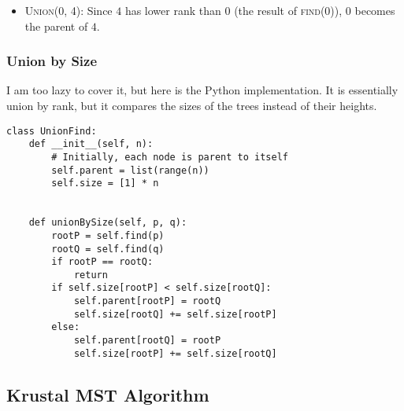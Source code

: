 \begin{itemize}
\begin{center}
    \end{center}
  \item \textsc{Union(0, 4)}: Since $4$ has lower rank than $0$ (the result of \textsc{find(0)}), $0$ becomes the parent of $4$.
    \begin{center}
    \end{center}
\end{itemize}

\subsubsection{Union by Size}

I am too lazy to cover it, but here is the Python implementation.
It is essentially union by rank, but it compares the sizes of the trees instead of their heights.

\begin{verbatim}
class UnionFind:
    def __init__(self, n):
        # Initially, each node is parent to itself
        self.parent = list(range(n))
        self.size = [1] * n


    def unionBySize(self, p, q):
        rootP = self.find(p)
        rootQ = self.find(q)
        if rootP == rootQ:
            return
        if self.size[rootP] < self.size[rootQ]:
            self.parent[rootP] = rootQ
            self.size[rootQ] += self.size[rootP]
        else:
            self.parent[rootQ] = rootP
            self.size[rootP] += self.size[rootQ]
\end{verbatim}

\subsection{Krustal MST Algorithm}

